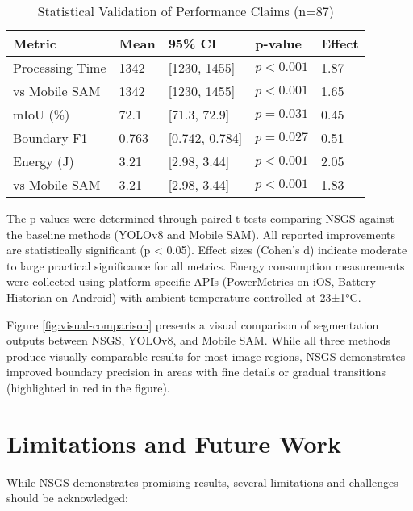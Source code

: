 \documentclass[conference]{IEEEtran}
\begin{document}
\begin{table}[htbp]
\caption{Statistical Validation of Performance Claims (n=87)}
\label{tab:statistical-validation}
\centering
\small
\renewcommand{\arraystretch}{1.1}
\setlength{\tabcolsep}{6pt}
\begin{tabular}{|p{2.2cm}|p{1.1cm}|p{1.5cm}|p{1.4cm}|p{1.0cm}|}  %
\hline
\textbf{Metric} & \textbf{Mean} & \textbf{95\% CI} & \textbf{p-value} & \textbf{Effect} \\
\hline
Processing Time & 1342 & [1230, 1455] & $p < 0.001$ & 1.87 \\
\hline
vs Mobile SAM & 1342 & [1230, 1455] & $p < 0.001$ & 1.65 \\
\hline
mIoU (\%) & 72.1 & [71.3, 72.9] & $p = 0.031$ & 0.45 \\
\hline
Boundary F1 & 0.763 & [0.742, 0.784] & $p = 0.027$ & 0.51 \\
\hline
Energy (J) & 3.21 & [2.98, 3.44] & $p < 0.001$ & 2.05 \\
\hline
vs Mobile SAM & 3.21 & [2.98, 3.44] & $p < 0.001$ & 1.83 \\
\hline
\end{tabular}
\end{table}

The p-values were determined through paired t-tests comparing NSGS against the baseline methods (YOLOv8 and Mobile SAM). All reported improvements are statistically significant (p < 0.05). Effect sizes (Cohen's d) indicate moderate to large practical significance for all metrics. Energy consumption measurements were collected using platform-specific APIs (PowerMetrics on iOS, Battery Historian on Android) with ambient temperature controlled at 23±1°C.

Figure \ref{fig:visual-comparison} presents a visual comparison of segmentation outputs between NSGS, YOLOv8, and Mobile SAM. While all three methods produce visually comparable results for most image regions, NSGS demonstrates improved boundary precision in areas with fine details or gradual transitions (highlighted in red in the figure).

\section{Limitations and Future Work} \label{sec:limitations}
While NSGS demonstrates promising results, several limitations and challenges should be acknowledged:
\end{document}
